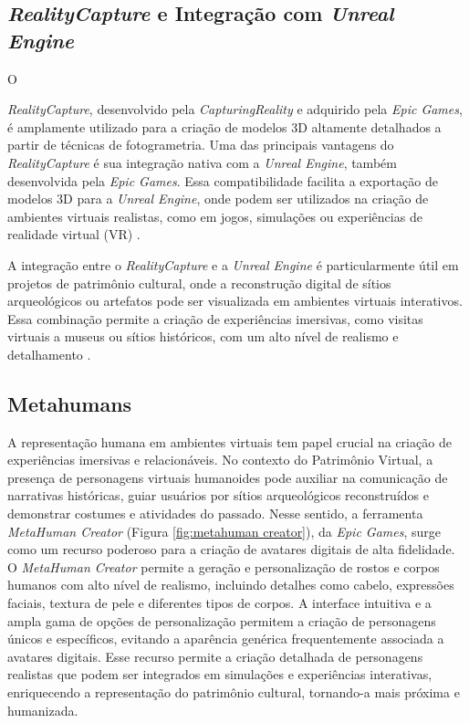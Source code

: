     \subsection{\textit{RealityCapture}  e Integração com \textit{Unreal Engine}}
    O {\textit{RealityCapture}, desenvolvido pela \textit{CapturingReality} e adquirido pela \textit{Epic Games}, é amplamente utilizado para a criação de modelos 3D altamente detalhados a partir de técnicas de fotogrametria. Uma das principais vantagens do \textit{RealityCapture} é sua integração nativa com a \textit{Unreal Engine}, também desenvolvida pela \textit{Epic Games}. Essa compatibilidade facilita a exportação de modelos 3D para a \textit{Unreal Engine}, onde podem ser utilizados na criação de ambientes virtuais realistas, como em jogos, simulações ou experiências de realidade virtual (VR) \citep{EpicGamesDocs}.
    
    A integração entre o \textit{RealityCapture} e a \textit{Unreal Engine} é particularmente útil em projetos de patrimônio cultural, onde a reconstrução digital de sítios arqueológicos ou artefatos pode ser visualizada em ambientes virtuais interativos. Essa combinação permite a criação de experiências imersivas, como visitas virtuais a museus ou sítios históricos, com um alto nível de realismo e detalhamento \citep{silva2022realidade}.
    \subsection{Metahumans}
    
    A representação humana em ambientes virtuais tem papel crucial na criação de experiências imersivas e relacionáveis. No contexto do Patrimônio Virtual, a presença de personagens virtuais humanoides pode auxiliar na comunicação de narrativas históricas, guiar usuários por sítios arqueológicos reconstruídos e demonstrar costumes e atividades do passado. Nesse sentido, a ferramenta \textit{MetaHuman Creator} (Figura \ref{fig:metahuman creator}), da \textit{Epic Games}, surge como um recurso poderoso para a criação de avatares digitais de alta fidelidade.
    O \textit{MetaHuman Creator} permite a geração e personalização de rostos e corpos humanos com alto nível de realismo, incluindo detalhes como cabelo, expressões faciais, textura de pele e diferentes tipos de corpos. A interface intuitiva e a ampla gama de opções de personalização permitem a criação de personagens únicos e específicos, evitando a aparência genérica frequentemente associada a avatares digitais. Esse recurso permite a criação detalhada de personagens realistas que podem ser integrados em simulações e experiências interativas, enriquecendo a representação do patrimônio cultural, tornando-a mais próxima e humanizada.
    
}
